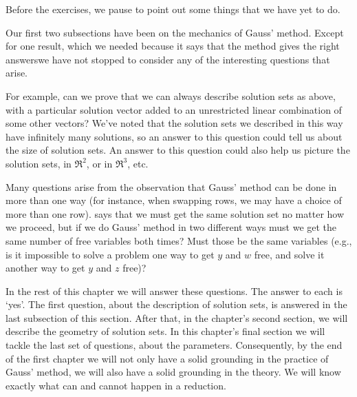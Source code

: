 Before the exercises, we pause to point out some things that we have yet to do.

Our first two subsections have been on the mechanics of Gauss' method.
Except for one result, \Dash which 
we needed because
it says that the method gives the right answers\Dash we 
have not stopped to consider any of the interesting questions
that arise.

For example, can we prove that we can 
always describe solution sets as above, with
a particular solution vector added to an unrestricted linear combination of 
some other vectors?
We've noted that the solution sets we described in this way 
have infinitely many solutions,
so an answer to this question
could tell us about the size of solution sets.
An answer to this question could also help us picture the solution
sets, in $\Re^2$, or in $\Re^3$, etc.

Many questions arise from the observation that Gauss' method can be done in 
more than one way (for instance, when swapping rows, we may have a choice of 
more than one row).
 says that we must get the same solution set
no matter how we proceed, but
if we do Gauss' method in two different ways
must we get the same number of free variables both times?
Must those be the same variables (e.g., is it impossible to
solve a problem
one way to get $y$ and $w$ free, and solve it another way to get $y$ and
$z$ free)?

In the rest of this chapter we will answer these questions.
The answer to each is `yes'.
The first question, about the description of solution sets, 
is answered in the last subsection of this section.
After that, in the chapter's second section, 
we will describe the geometry of solution sets.
In this chapter's final section we will tackle the last set of questions,
about the parameters. 
Consequently, by the end of the first chapter we will not only have a 
solid grounding in the practice of Gauss' method, 
we will also have a solid grounding in the theory.
We will know exactly what can and cannot happen in a reduction.

